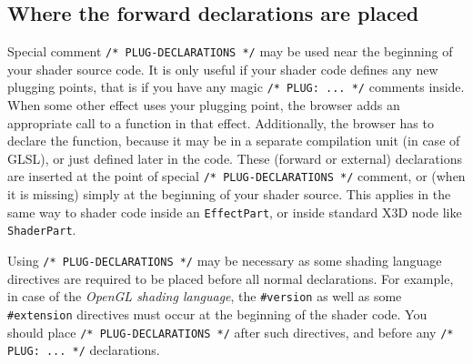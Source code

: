 \documentclass{acmsiggraph}                     %
\begin{document}
\subsection{Where the forward declarations are placed}

Special comment \texttt{/* PLUG-DECLARATIONS */} may be used
near the beginning of your shader source code. It is only useful
if your shader code defines any new plugging points, that is if you
have any magic \texttt{/* PLUG: ... */} comments inside.
When some other effect uses your plugging point, the browser adds
an appropriate call to a function in that effect.
Additionally, the browser has to declare the function,
because it may be in a separate compilation unit (in case of GLSL),
or just defined later in the code.
These (forward or external) declarations are inserted at
the point of special \texttt{/* PLUG-DECLARATIONS */}
comment, or (when it is missing) simply at the beginning of your shader source.
This applies in the same way to shader code inside an \texttt{EffectPart},
or inside standard X3D node like \texttt{ShaderPart}.

Using \texttt{/* PLUG-DECLARATIONS */} may be necessary
as some shading language directives are required to be placed before
all normal declarations. For example, in case of the \emph{OpenGL shading language},
the \texttt{\#version} as well as some \texttt{\#extension} directives
must occur at the beginning of the shader code. You should place
\texttt{/* PLUG-DECLARATIONS */} after such directives,
and before any \texttt{/* PLUG: ... */} declarations.
\end{document}
